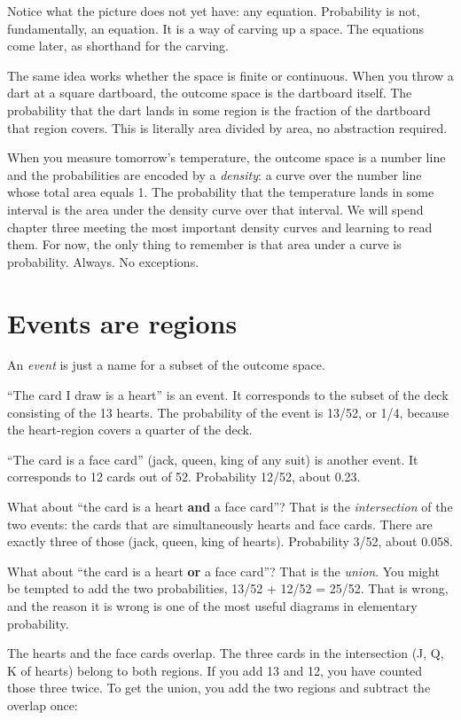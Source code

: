 \documentclass[
  letterpaper,
  11pt,
  twoside,
  openany]{scrbook}
\begin{document}
Notice what the picture does not yet have: any equation. Probability is
not, fundamentally, an equation. It is a way of carving up a space. The
equations come later, as shorthand for the carving.

The same idea works whether the space is finite or continuous. When you
throw a dart at a square dartboard, the outcome space is the dartboard
itself. The probability that the dart lands in some region is the
fraction of the dartboard that region covers. This is literally area
divided by area, no abstraction required.

When you measure tomorrow's temperature, the outcome space is a number
line and the probabilities are encoded by a \emph{density}: a curve over
the number line whose total area equals 1. The probability that the
temperature lands in some interval is the area under the density curve
over that interval. We will spend chapter three meeting the most
important density curves and learning to read them. For now, the only
thing to remember is that area under a curve is probability. Always. No
exceptions.

\section{Events are regions}\label{events-are-regions}

An \emph{event} is just a name for a subset of the outcome space.

``The card I draw is a heart'' is an event. It corresponds to the subset
of the deck consisting of the 13 hearts. The probability of the event is
13/52, or 1/4, because the heart-region covers a quarter of the deck.

``The card is a face card'' (jack, queen, king of any suit) is another
event. It corresponds to 12 cards out of 52. Probability 12/52, about
0.23.

What about ``the card is a heart \textbf{and} a face card''? That is the
\emph{intersection} of the two events: the cards that are simultaneously
hearts and face cards. There are exactly three of those (jack, queen,
king of hearts). Probability 3/52, about 0.058.

What about ``the card is a heart \textbf{or} a face card''? That is the
\emph{union}. You might be tempted to add the two probabilities, 13/52 +
12/52 = 25/52. That is wrong, and the reason it is wrong is one of the
most useful diagrams in elementary probability.

The hearts and the face cards overlap. The three cards in the
intersection (J, Q, K of hearts) belong to both regions. If you add 13
and 12, you have counted those three twice. To get the union, you add
the two regions and subtract the overlap once:
\end{document}
